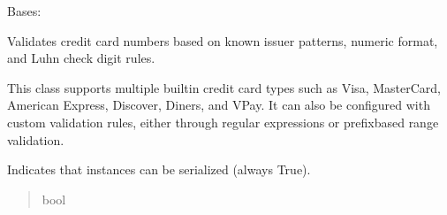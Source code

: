 \documentclass[letterpaper,10pt,english]{sphinxmanual}
\begin{document}
\begin{fulllineitems}
\label{\detokenize{apache_commons_validator_python.routines:apache_commons_validator_python.routines.credit_card_validator.CreditCardValidator}}
\pysigstartsignatures
{}
\pysigstopsignatures
\sphinxAtStartPar
Bases: 

\sphinxAtStartPar
Validates credit card numbers based on known issuer patterns, numeric format, and
Luhn check digit rules.

\sphinxAtStartPar
This class supports multiple built\sphinxhyphen{}in credit card types such as Visa, MasterCard,
American Express, Discover, Diners, and VPay. It can also be configured with
custom validation rules, either through regular expressions or prefix\sphinxhyphen{}based
range validation.

\begin{fulllineitems}
\label{\detokenize{apache_commons_validator_python.routines:apache_commons_validator_python.routines.credit_card_validator.CreditCardValidator.serializable}}
\pysigstartsignatures
{}
\pysigstopsignatures
\sphinxAtStartPar
Indicates that instances can be serialized (always True).
\begin{quote}\begin{description}
\sphinxAtStartPar
bool


\end{description}
\end{quote}
\end{fulllineitems}
\end{fulllineitems}
\end{document}
